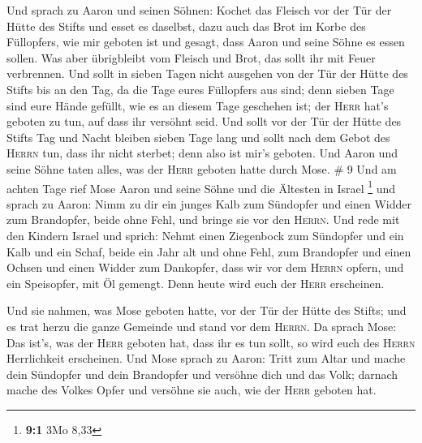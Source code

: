  Und sprach zu Aaron und seinen Söhnen: Kochet das
Fleisch vor der Tür der Hütte des Stifts und esset es daselbst, dazu
auch das Brot im Korbe des Füllopfers, wie mir geboten ist und gesagt,
dass Aaron und seine Söhne es essen sollen.  Was aber
übrigbleibt vom Fleisch und Brot, das sollt ihr mit Feuer verbrennen.
 Und sollt in sieben Tagen nicht ausgehen von der Tür der
Hütte des Stifts bis an den Tag, da die Tage eures Füllopfers aus sind;
denn sieben Tage sind eure Hände gefüllt,  wie es an
diesem Tage geschehen ist; der \textsc{Herr} hat's geboten zu tun, auf
dass ihr versöhnt seid.  Und sollt vor der Tür der Hütte
des Stifts Tag und Nacht bleiben sieben Tage lang und sollt nach dem
Gebot des \textsc{Herrn} tun, dass ihr nicht sterbet; denn also ist
mir's geboten.  Und Aaron und seine Söhne taten alles,
was der \textsc{Herr} geboten hatte durch Mose. \# 9  Und
am achten Tage rief Mose Aaron und seine Söhne und die Ältesten in
Israel \footnote{\textbf{9:1} 3Mo 8,33}  und sprach zu
Aaron: Nimm zu dir ein junges Kalb zum Sündopfer und einen Widder zum
Brandopfer, beide ohne Fehl, und bringe sie vor den \textsc{Herrn}.
 Und rede mit den Kindern Israel und sprich: Nehmt einen
Ziegenbock zum Sündopfer und ein Kalb und ein Schaf, beide ein Jahr alt
und ohne Fehl, zum Brandopfer  und einen Ochsen und einen
Widder zum Dankopfer, dass wir vor dem \textsc{Herrn} opfern, und ein
Speisopfer, mit Öl gemengt. Denn heute wird euch der \textsc{Herr}
erscheinen.

 Und sie nahmen, was Mose geboten hatte, vor der Tür der
Hütte des Stifts; und es trat herzu die ganze Gemeinde und stand vor dem
\textsc{Herrn}.  Da sprach Mose: Das ist's, was der
\textsc{Herr} geboten hat, dass ihr es tun sollt, so wird euch des
\textsc{Herrn} Herrlichkeit erscheinen.  Und Mose sprach
zu Aaron: Tritt zum Altar und mache dein Sündopfer und dein Brandopfer
und versöhne dich und das Volk; darnach mache des Volkes Opfer und
versöhne sie auch, wie der \textsc{Herr} geboten hat.


